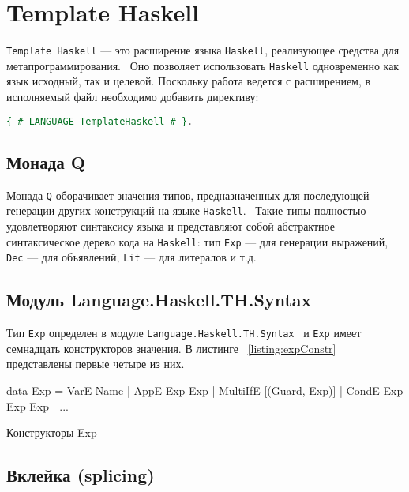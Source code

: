 \section{Template Haskell}

\lstinline{Template Haskell} --- это расширение языка \lstinline{Haskell}, реализующее средства для метапрограммирования.~\cite{extensionHub} Оно позволяет использовать \lstinline{Haskell} одновременно как язык исходный, так и целевой. Поскольку работа ведется с расширением, в исполняемый файл необходимо добавить директиву:

\begin{lstlisting}[language=Haskell]
{-# LANGUAGE TemplateHaskell #-}.
\end{lstlisting}

\subsection{Монада Q}

Монада \lstinline{Q} оборачивает значения типов, предназначенных для последующей генерации других конструкций на языке \lstinline{Haskell}.~\cite{tempHaskell} Такие типы полностью удовлетворяют синтаксису языка и представляют собой абстрактное синтаксическое дерево кода на \lstinline{Haskell}: тип \lstinline{Exp} --- для генерации выражений, \lstinline{Dec} --- для объявлений, \lstinline{Lit} --- для литералов и т.д.~\cite{thSyntax}

\subsection{Модуль Language.Haskell.TH.Syntax}

Тип \lstinline{Exp} определен в модуле \lstinline{Language.Haskell.TH.Syntax}~\cite{coverHaskell} и  \lstinline{Exp} имеет семнадцать конструкторов значения. В листинге ~\ref{listing:expConstr} представлены первые четыре из них.  

\begin{ListingEnv}[H]
\begin{Verb}
data Exp
       = VarE Name
       | AppE Exp Exp
       | MultiIfE [(Guard, Exp)]
       | CondE Exp Exp Exp
       | ...
\end{Verb}
\caption{Конструкторы Exp}
\label{listing:expConstr}
\end{ListingEnv}

\subsection{Вклейка (splicing)}

